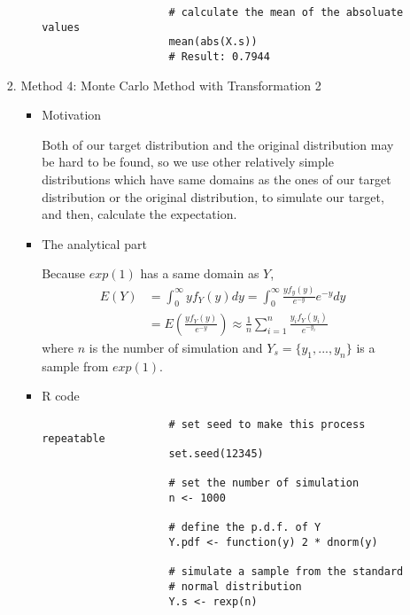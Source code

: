 \begin{enumerate}
\begin{enumerate}
\begin{enumerate}
\begin{itemize}
\begin{verbatim}
					# calculate the mean of the absoluate values
					mean(abs(X.s))
					# Result: 0.7944
					\end{verbatim}
				\end{itemize}
				\item Method 4: Monte Carlo Method with Transformation 2
				\begin{itemize}
					\item Motivation
					\par Both of our target distribution and the original distribution may be hard to be found, so we use other relatively simple distributions which have same domains as the ones of our target distribution or the original distribution, to simulate our target, and then, calculate the expectation.
					\item 
				\par The analytical part
				\par Because $exp(1)$ has a same domain as $Y$, 
				\begin{equation*}
				\begin{split}
					E(Y) &= \int_{0}^{\infty}yf_Y(y)dy = \int_{0}^{\infty}\frac{yf_y(y)}{e^{-y}}e^{-y}dy \\
					&
					= E(\frac{yf_Y(y)}{e^{-y}}) \approx \frac{1}{n}\sum_{i=1}^{n}\frac{y_if_Y(y_i)}{e^{-y_i}}
				\end{split}
				\end{equation*}
				where $n$ is the number of simulation and $Y_s = \{y_1, ..., y_n\}$ is a sample from $exp(1)$.
				
					\item R code
					\begin{verbatim}
					# set seed to make this process repeatable
					set.seed(12345)
					
					# set the number of simulation
					n <- 1000
					
					# define the p.d.f. of Y
					Y.pdf <- function(y) 2 * dnorm(y)
					
					# simulate a sample from the standard 
					# normal distribution
					Y.s <- rexp(n)
					

\end{verbatim}
\end{itemize}
\end{enumerate}
\end{enumerate}
\end{enumerate}
